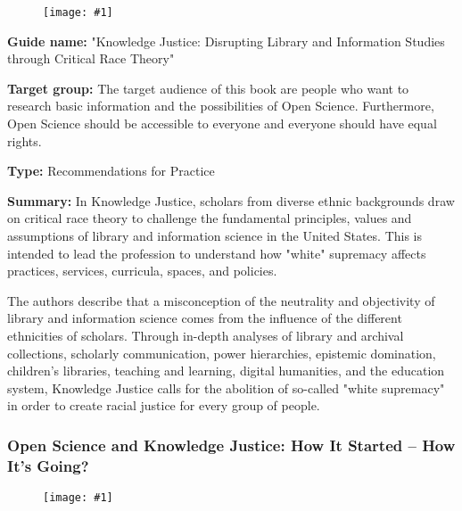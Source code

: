 \documentclass{article}
\newlength{\imgwidth}
\newcommand\scaledgraphics[2]{%
                
\settowidth{\imgwidth}{\texttt{[image: \#1]}}%
                
\setlength{\imgwidth}{\minof{\imgwidth}{#2\textwidth}}%
                
\texttt{[image: \#1]}%
                
}
\begin{document}
\begin{center}
\begin{figure}
\scaledgraphics{dcc1d35b-4186-4b50-a5a6-cf54422a8064.jpeg}{0.5}
\label{F29320001}
\end{figure}


\end{center}





\textbf{Guide name:} "Knowledge Justice: Disrupting Library and Information Studies through Critical Race Theory" \autocite{leung_knowledge_2021}


\textbf{Target group: }The target audience of this book are people who want to research basic information and the possibilities of Open Science. Furthermore, Open Science should be accessible to everyone and everyone should have equal rights.


\textbf{Type:} Recommendations for Practice


\textbf{Summary: }In Knowledge Justice, scholars from diverse ethnic backgrounds draw on critical race theory to challenge the fundamental principles, values and assumptions of library and information science in the United States. This is intended to lead the profession to understand how "white" supremacy affects practices, services, curricula, spaces, and policies.


The authors describe that a misconception of the neutrality and objectivity of library and information science comes from the influence of the different ethnicities of scholars. Through in-depth analyses of library and archival collections, scholarly communication, power hierarchies, epistemic domination, children's libraries, teaching and learning, digital humanities, and the education system, Knowledge Justice calls for the abolition of so-called "white supremacy" in order to create racial justice for every group of people.


\subsubsection{Open Science and Knowledge Justice: How It Started – How It’s Going?}\label{H480694}


\begin{figure}
\scaledgraphics{e590694e-3a8f-4a2f-801f-704d7d8edbc0.png}{1}
\label{F3873651}
\end{figure}
\end{document}
